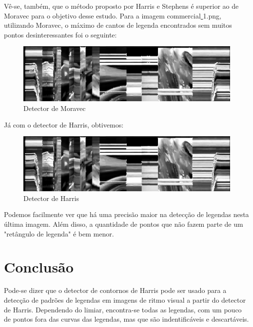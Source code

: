\documentclass[10pt,a4paper]{article}
\begin{document}
Vê-se, também, que o método proposto por Harris e Stephens é superior ao de
Moravec para o objetivo desse estudo. Para a imagem
commercial\underline{ }1.png, utilizando
Moravec, o máximo de cantos de legenda encontrados sem muitos pontos
desinteressantes foi o seguinte:

\begin{figure}[h!]
  \begin{center}
    \includegraphics[scale=0.55]{img/commercial_1_moravec_t2500}
    \caption{Detector de Moravec}
  \end{center}
\end{figure}



Já com o detector de Harris, obtivemos:

\begin{figure}[h!]
  \begin{center}
    \includegraphics[scale=0.55]{img/commercial_1_t1125000000}
    \caption{Detector de Harris}
  \end{center}
\end{figure}


Podemos facilmente ver que há uma precisão maior na detecção de legendas nesta
última imagem. Além disso, a quantidade de pontos que não fazem parte de um
"retângulo de legenda" é bem menor.

\newpage
\section{Conclusão}
Pode-se dizer que o detector de contornos de Harris pode 
ser usado para a detecção de padrões de legendas em imagens de ritmo visual a
partir do detector de Harris.
Dependendo do limiar, encontra-se todas as legendas, com um pouco de
pontos fora das curvas das legendas, mas que são indentificáveis e descartáveis.


\begin{small}
  
\end{small}
\end{document}
